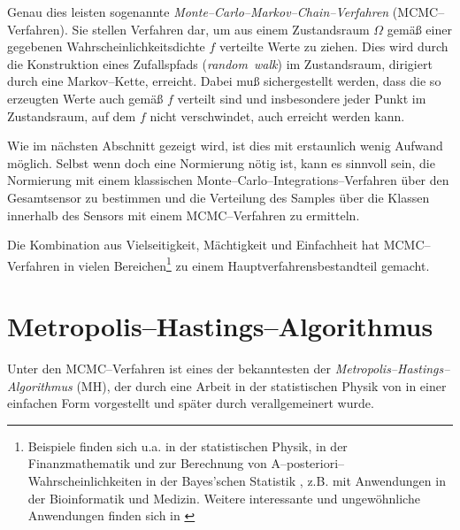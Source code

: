 	Genau dies leisten sogenannte {\em Mon\-te--Car\-lo--Mar\-kov--Chain--Ver\-fahr\-en} (MCMC--Verfahren). Sie stellen Verfahren dar, um aus einem Zustandsraum $\Omega$ gemäß einer gegebenen Wahrscheinlichkeitsdichte $f$ verteilte Werte zu ziehen. Dies wird durch die Konstruktion eines Zufallspfads ({\em random~walk}) im Zustandsraum, dirigiert durch eine Markov--Kette, erreicht. Dabei muß sichergestellt werden, dass die so erzeugten Werte auch gemäß $f$ verteilt sind und insbesondere jeder Punkt im Zustandsraum, auf dem $f$ nicht verschwindet, auch erreicht werden kann.
	
	Wie im nächsten Abschnitt gezeigt wird, ist dies mit erstaunlich wenig Aufwand möglich. Selbst wenn doch eine Normierung nötig ist, kann es sinnvoll sein, die Normierung mit einem klassischen Monte--Carlo--Integrations--Verfahren über den Gesamtsensor zu bestimmen und die Verteilung des Samples über die Klassen innerhalb des Sensors mit einem MCMC--Verfahren zu ermitteln.
	
	Die Kombination aus Vielseitigkeit, Mächtigkeit und Einfachheit hat MCMC--Verfahren in vielen Bereichen\footnote{Beispiele finden sich u.a. in der statistischen Physik, in der Finanzmathematik und zur Berechnung von A--posteriori--Wahrscheinlichkeiten in der Bayes'schen Statistik \citep{Geweke:1989p10465}, z.B. mit Anwendungen in der Bioinformatik und Medizin. Weitere interessante und ungewöhnliche Anwendungen finden sich in \citep{Diaconis:2009p4122}} zu einem Hauptverfahrensbestandteil gemacht.
	
	
	\section{Metropolis--Hastings--Algorithmus}
	Unter den MCMC--Verfahren ist eines der bekanntesten der {\em Metropolis--Hastings--Algorithmus} (MH), der durch eine Arbeit in der statistischen Physik von \citet{Metropolis:1953p3364} in einer einfachen Form vorgestellt und später durch \citet{Hastings:1970p3387} verallgemeinert wurde.

